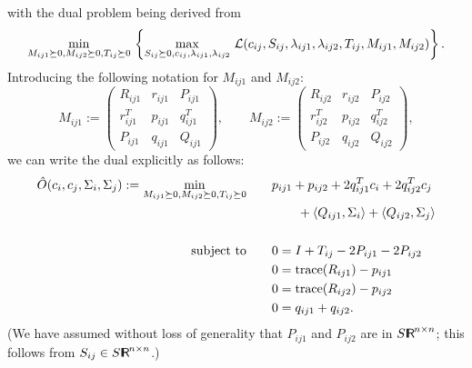 \documentclass{siamltex}
\begin{document}
with the dual problem being derived from
\[
\min_{M_{ij1} \succeq 0, M_{ij2} \succeq 0, T_{ij} \succeq 0} \, \left\{
\max_{S_{ij} \succeq 0, c_{ij}, \lambda_{ij1},\lambda_{ij2}} \,
{\cal L} (c_{ij}, S_{ij},\lambda_{ij1}, \lambda_{ij2}, T_{ij}, M_{ij1}, M_{ij2}) \right\}.
\]
Introducing the following notation for $M_{ij1}$ and $M_{ij2}$:
\begin{equation} \label{def:M}
M_{ij1}:=\begin{pmatrix} R_{ij1} & r_{ij1} & P_{ij1} \\ r_{ij1}^T & p_{ij1} & q_{ij1}^T\\ P_{ij1} & q_{ij1} & Q_{ij1}\end{pmatrix}, \qquad 
M_{ij2}:=\begin{pmatrix} R_{ij2} & r_{ij2} & P_{ij2} \\ r_{ij2}^T & p_{ij2} & q_{ij2}^T\\ P_{ij2} & q_{ij2} & Q_{ij2}\end{pmatrix},
\end{equation}
we can write the dual explicitly as follows:
\begin{align}
\label{prob:dual_lin_max_volume_ell}
\hat{O} (c_i,c_j,\Sigma_i,\Sigma_j) := 
\nonumber
\min_{M_{ij1} \succeq 0, M_{ij2} \succeq 0, T_{ij}\succeq 0} \qquad&
p_{ij1}+p_{ij2}+2q_{ij1}^Tc_i+2q_{ij2}^Tc_j \\
\nonumber
& \qquad +\langle Q_{ij1},\Sigma_{i}\rangle+\langle Q_{ij2},\Sigma_{j}\rangle \nonumber\\ &\nonumber \\
\mbox{subject to} \qquad &0=I+T_{ij}-2P_{ij1}- 2P_{ij2}\\
&0={\mbox{\rm trace}}(R_{ij1})-p_{ij1}\nonumber\\ &0={\mbox{\rm trace}}(R_{ij2})-p_{ij2}\nonumber\\  &0=q_{ij1}+q_{ij2}. \nonumber
\end{align}
(We have assumed without loss of generality that $P_{ij1}$ and
$P_{ij2}$ are in $S {\makebox{\sf I \hspace{-8.5 pt} R \hspace{-4.0pt}}}^{n \times n}$; this follows from $S_{ij} \in S
{\makebox{\sf I \hspace{-8.5 pt} R \hspace{-4.0pt}}}^{n \times n}$.)
\end{document}
